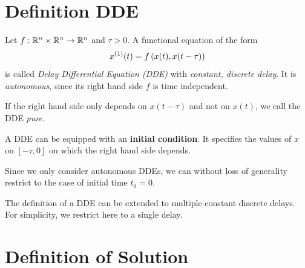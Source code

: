 \section{Definition DDE}
    \label{sec:definition-dde}

    \begin{definition}\label{def:dde}
        Let $f:\mathbb{R}^n\times\mathbb{R}^n\rightarrow\mathbb{R}^n$ and $\tau > 0$.
        A functional equation of the form
        \begin{equation}
            \D{x}(t) = f\left(x(t),x(t-\tau)\right)
        \end{equation}
        is called \emph{Delay Differential Equation (DDE)} with \emph{constant, discrete delay}. It is \emph{autonomous}, since its right hand side $f$ is time independent.

        If the right hand side only depends on $x(t-\tau)$ and not on $x(t)$, we call the DDE \emph{pure}.

        A DDE can be equipped with an \textbf{initial condition}. It specifies the values of $x$ on $[-\tau, 0]$ on which the right hand side depends.

    \end{definition}

    Since we only consider autonomous DDEs, we can without loss of generality restrict to the case of initial time $t_0=0$.

    The definition of a DDE can be extended to multiple constant discrete delays. For simplicity, we restrict here to a single delay.

\section{Definition of Solution}
    \label{sec:definition-of-solution}

